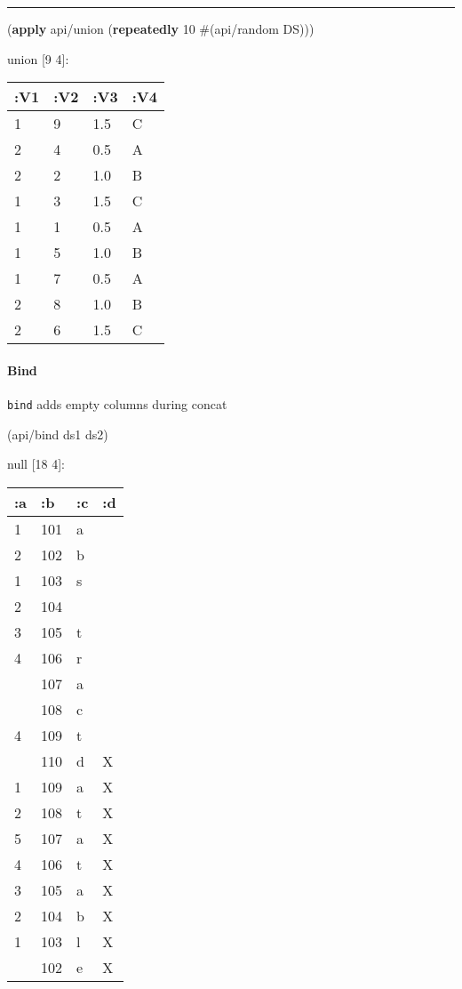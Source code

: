\documentclass[]{article}
\newenvironment{Shaded}{\begin{snugshade}}{\end{snugshade}}
\newcommand{\DecValTok}[1]{\textcolor[rgb]{0.00,0.00,0.81}{#1}}
\newcommand{\KeywordTok}[1]{\textcolor[rgb]{0.13,0.29,0.53}{\textbf{#1}}}
\newcommand{\NormalTok}[1]{#1}
\let\oldparagraph\paragraph
\renewcommand{\paragraph}[1]{\oldparagraph{#1}\mbox{}}
\begin{document}
\begin{center}\rule{0.5\linewidth}{0.5pt}\end{center}

\begin{Shaded}
\begin{Highlighting}[]
\NormalTok{(}\KeywordTok{apply}\NormalTok{ api/union (}\KeywordTok{repeatedly} \DecValTok{10}\NormalTok{ #(api/random DS)))}
\end{Highlighting}
\end{Shaded}

union {[}9 4{]}:

\begin{longtable}[]{@{}llll@{}}
\toprule
:V1 & :V2 & :V3 & :V4\tabularnewline
\midrule
\endhead
1 & 9 & 1.5 & C\tabularnewline
2 & 4 & 0.5 & A\tabularnewline
2 & 2 & 1.0 & B\tabularnewline
1 & 3 & 1.5 & C\tabularnewline
1 & 1 & 0.5 & A\tabularnewline
1 & 5 & 1.0 & B\tabularnewline
1 & 7 & 0.5 & A\tabularnewline
2 & 8 & 1.0 & B\tabularnewline
2 & 6 & 1.5 & C\tabularnewline
\bottomrule
\end{longtable}

\hypertarget{bind}{%
\paragraph{Bind}\label{bind}}

\texttt{bind} adds empty columns during concat

\begin{Shaded}
\begin{Highlighting}[]
\NormalTok{(api/bind ds1 ds2)}
\end{Highlighting}
\end{Shaded}

null {[}18 4{]}:

\begin{longtable}[]{@{}llll@{}}
\toprule
:a & :b & :c & :d\tabularnewline
\midrule
\endhead
1 & 101 & a &\tabularnewline
2 & 102 & b &\tabularnewline
1 & 103 & s &\tabularnewline
2 & 104 & &\tabularnewline
3 & 105 & t &\tabularnewline
4 & 106 & r &\tabularnewline
& 107 & a &\tabularnewline
& 108 & c &\tabularnewline
4 & 109 & t &\tabularnewline
& 110 & d & X\tabularnewline
1 & 109 & a & X\tabularnewline
2 & 108 & t & X\tabularnewline
5 & 107 & a & X\tabularnewline
4 & 106 & t & X\tabularnewline
3 & 105 & a & X\tabularnewline
2 & 104 & b & X\tabularnewline
1 & 103 & l & X\tabularnewline
& 102 & e & X\tabularnewline
\bottomrule
\end{longtable}
\end{document}
